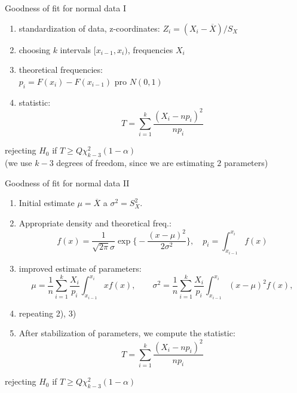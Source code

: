 \documentclass[smaller]{beamer}
\def\ol#1{\overline{#1}}
\begin{document}
\begin{frame}{Goodness of fit for normal data I} 
\begin{enumerate}
 \item standardization of data, z-coordinates: $Z_i = (X_i - \ol{X}) / S_X $
 \item choosing $k$ intervals $[x_{i-1}, x_i)$, frequencies $X_i$
 \item theoretical frequencies:\\
 $p_i = F(x_{i}) - F(x_{i-1})$ pro $N(0,1)$
 \item statistic:
\[
 T=\sum_{i=1}^k \frac{ (X_i - np_i)^2}{np_i} 
\]
\end{enumerate}
rejecting $H_0$ if $T \ge Q\chi^2_{k-3} (1-\alpha)$\\
 (we use  $k-3$ degrees of freedom, since we are estimating $2$ parameters)
\end{frame}

\begin{frame}{Goodness of fit for normal data II}
\begin{enumerate}
 \item Initial estimate $\mu = \ol{X}$ a $\sigma^2 = S_X^2$.
 \item Appropriate density and theoretical freq.:
\[
 f(x)=\frac{1}{\sqrt{2\pi}\sigma} \exp\Big\{-\frac{(x-\mu)^2}{2\sigma^2}\Big\},\quad p_i = \int_{x_{i-1}}^{x_i} f(x)
\]
  \item  improved estimate of parameters: 
\[
 \mu = \frac{1}{n}\sum_{i=1}^{k} \frac{X_i}{p_i} \int_{x_{i-1}}^{x_i} xf(x),
 \qquad
 \sigma^2 = \frac{1}{n}\sum_{i=1}^{k} \frac{X_i}{p_i} \int_{x_{i-1}}^{x_i} (x - \mu)^2 f(x),
\]
\item repeating 2), 3)
\item After stabilization of parameters, we compute the statistic:
\[
 T=\sum_{i=1}^k \frac{ (X_i - np_i)^2}{np_i} 
\]
\end{enumerate}
rejecting $H_0$ if $T \ge Q\chi^2_{k-3} (1-\alpha)$
\end{frame}
\end{document}
